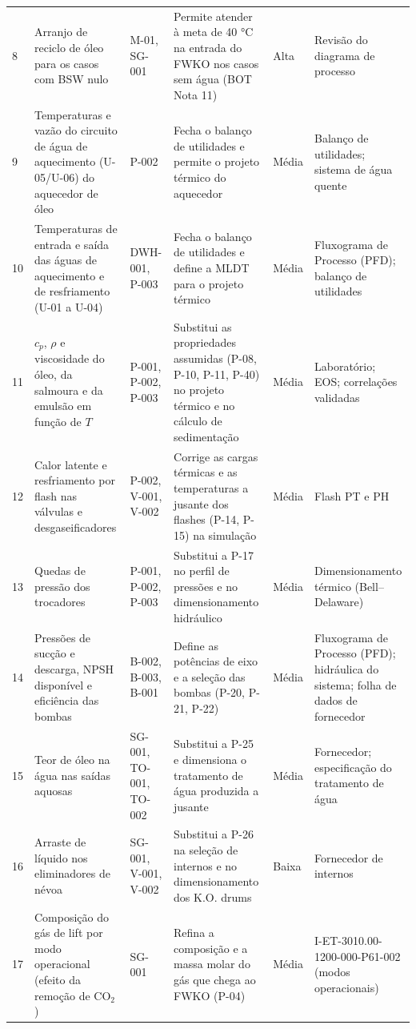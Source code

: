 \documentclass[11pt,a4paper]{article}
\numberwithin{equation}{section}
\numberwithin{table}{section}
\numberwithin{figure}{section}
\begin{document}
\begin{landscape}
\begin{longtable}{lL{6.0cm}L{2.9cm}L{5.2cm}lL{4.2cm}}
8 & Arranjo de reciclo de óleo para os casos com BSW nulo & M-01, SG-001 & Permite atender à meta de 40 °C na entrada do FWKO nos casos sem água (BOT Nota 11) & Alta & Revisão do diagrama de processo\\
9 & Temperaturas e vazão do circuito de água de aquecimento (U-05/U-06) do aquecedor de óleo & P-002 & Fecha o balanço de utilidades e permite o projeto térmico do aquecedor & Média & Balanço de utilidades; sistema de água quente\\
10 & Temperaturas de entrada e saída das águas de aquecimento e de resfriamento (U-01 a U-04) & DWH-001, P-003 & Fecha o balanço de utilidades e define a MLDT para o projeto térmico & Média & Fluxograma de Processo (PFD); balanço de utilidades\\
11 & $c_p$, $\rho$ e viscosidade do óleo, da salmoura e da emulsão em função de $T$ & P-001, P-002, P-003 & Substitui as propriedades assumidas (P-08, P-10, P-11, P-40) no projeto térmico e no cálculo de sedimentação & Média & Laboratório; EOS; correlações validadas\\
12 & Calor latente e resfriamento por flash nas válvulas e desgaseificadores & P-002, V-001, V-002 & Corrige as cargas térmicas e as temperaturas a jusante dos flashes (P-14, P-15) na simulação & Média & Flash PT e PH\\
13 & Quedas de pressão dos trocadores & P-001, P-002, P-003 & Substitui a P-17 no perfil de pressões e no dimensionamento hidráulico & Média & Dimensionamento térmico (Bell--Delaware)\\
14 & Pressões de sucção e descarga, NPSH disponível e eficiência das bombas & B-002, B-003, B-001 & Define as potências de eixo e a seleção das bombas (P-20, P-21, P-22) & Média & Fluxograma de Processo (PFD); hidráulica do sistema; folha de dados de fornecedor\\
15 & Teor de óleo na água nas saídas aquosas & SG-001, TO-001, TO-002 & Substitui a P-25 e dimensiona o tratamento de água produzida a jusante & Média & Fornecedor; especificação do tratamento de água\\
16 & Arraste de líquido nos eliminadores de névoa & SG-001, V-001, V-002 & Substitui a P-26 na seleção de internos e no dimensionamento dos K.O. drums & Baixa & Fornecedor de internos\\
17 & Composição do gás de lift por modo operacional (efeito da remoção de CO$_2$) & SG-001 & Refina a composição e a massa molar do gás que chega ao FWKO (P-04) & Média & I-ET-3010.00-1200-000-P61-002 (modos operacionais)\\

\end{longtable}
\end{landscape}
\end{document}
